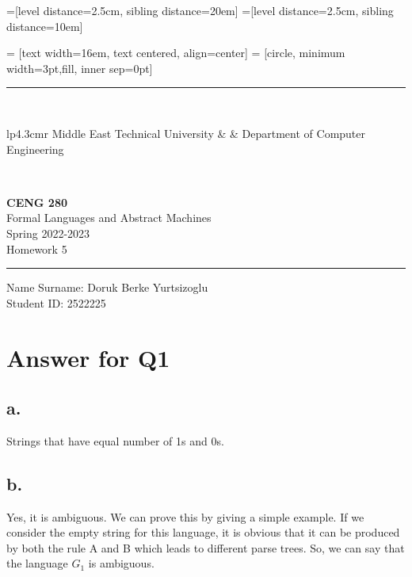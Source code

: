 \documentclass[12pt]{article}
\newcommand{\HRule}{\rule{\linewidth}{1mm}}
\begin{document}
=[level distance=2.5cm, sibling distance=20em]
=[level distance=2.5cm, sibling distance=10em]

 = [text width=16em, text centered, align=center]
 = [circle, minimum width=3pt,fill, inner sep=0pt]

\noindent
\HRule \\[3mm]
\small
\begin{tabular}[b]{lp{4.3cm}r}
Middle East Technical University &  &
Department of Computer Engineering \\
\end{tabular} \\
\begin{center}

                 \LARGE \textbf{CENG 280} \\[4mm]
                 \Large Formal Languages and Abstract Machines \\[4mm]
                \normalsize Spring 2022-2023 \\
                    \Large Homework 5 \\
\end{center}
\HRule



\begin{center}
Name Surname: Doruk Berke Yurtsizoglu   \\
Student ID: 2522225
\end{center}



\section*{Answer for Q1}

\subsection*{a.} 

Strings that have equal number of 1s and 0s.


\subsection*{b.}    


Yes, it is ambiguous. We can prove this by giving a simple example. If we consider the empty string for this language, it is obvious that it can be produced by both the rule A and B which leads to different parse trees. So, we can say that the language $G_1$ is ambiguous.
\end{document}
